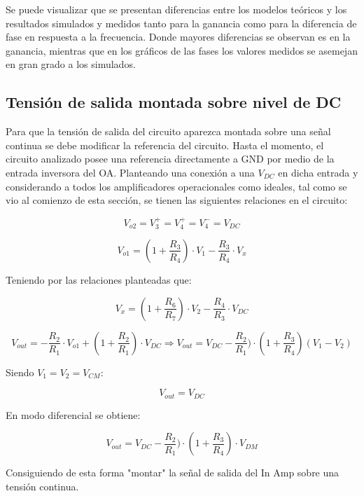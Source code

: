 Se puede visualizar que se presentan diferencias entre los modelos teóricos y los resultados simulados y medidos tanto para la ganancia como para la diferencia de fase en respuesta a la frecuencia.
Donde mayores diferencias se observan es en la ganancia, mientras que en los gráficos de las fases los valores medidos se asemejan en gran grado a los simulados.

\subsection{Tensión de salida montada sobre nivel de DC}

Para que la tensión de salida del circuito aparezca montada sobre una señal continua se debe modificar la referencia del circuito. Hasta el momento, el circuito analizado posee una referencia directamente
a GND por medio de la entrada inversora del OA. Planteando una conexión a una $V_{DC}$ en dicha entrada y considerando a todos los amplificadores operacionales como ideales, tal como se vio al comienzo 
de esta sección, se tienen las siguientes relaciones en el circuito:

$$V_{o2}=V^{+}_{3}=V^{+}_{4}=V^{-}_{4} = V_{DC}$$

$$V_{o1} = \left(1+\frac{R_3}{R_4}\right)\cdot V_{1}  - \frac{R_3}{R_4}\cdot V_x$$

Teniendo por las relaciones planteadas que:

$$V_x = (1+\frac{R_6}{R_7}) \cdot V_2 - \frac{R_4}{R_3}\cdot V_{DC}$$
              
$$V_{out} = -\frac{R_{2}}{R_{1}}\cdot V_{o1} + (1+\frac{R_2}{R_1}) \cdot V_{DC} \Rightarrow V_{out} = V_{DC} - \frac{R_2}{R_1})\cdot (1+\frac{R_3}{R_4}) (V_{1}-V_{2})$$

Siendo $V_{1}=V_{2}=V_{CM}$:

$$V_{out} = V_{DC}$$

En modo diferencial se obtiene:

$$V_{out} = V_{DC} - \frac{R_2}{R_1})\cdot (1+\frac{R_3}{R_4})\cdot V_{DM}$$

Consiguiendo de esta forma "montar" la señal de salida del In Amp sobre una tensión continua. 



